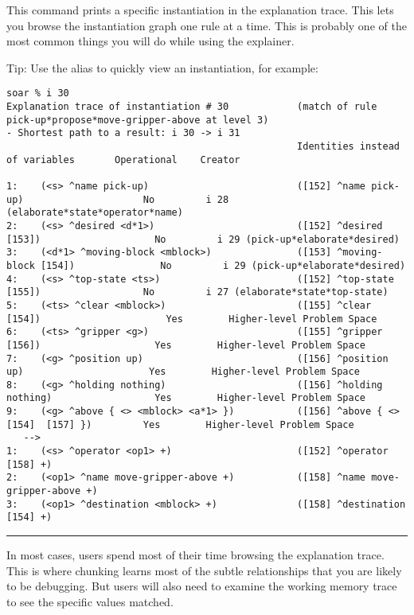 This command prints a specific instantiation in the explanation trace.  This lets you browse the instantiation graph one rule at a time. This is probably one of the most common things you will do while using the explainer.

Tip: Use the alias  to quickly view an instantiation, for example:

{\tiny
\begin{verbatim}
soar % i 30
Explanation trace of instantiation # 30            (match of rule pick-up*propose*move-gripper-above at level 3)
- Shortest path to a result: i 30 -> i 31
                                                   Identities instead of variables       Operational    Creator

1:    (<s> ^name pick-up)                          ([152] ^name pick-up)                     No         i 28 (elaborate*state*operator*name)
2:    (<s> ^desired <d*1>)                         ([152] ^desired [153])                    No         i 29 (pick-up*elaborate*desired)
3:    (<d*1> ^moving-block <mblock>)               ([153] ^moving-block [154])               No         i 29 (pick-up*elaborate*desired)
4:    (<s> ^top-state <ts>)                        ([152] ^top-state [155])                  No         i 27 (elaborate*state*top-state)
5:    (<ts> ^clear <mblock>)                       ([155] ^clear [154])                      Yes        Higher-level Problem Space
6:    (<ts> ^gripper <g>)                          ([155] ^gripper [156])                    Yes        Higher-level Problem Space
7:    (<g> ^position up)                           ([156] ^position up)                      Yes        Higher-level Problem Space
8:    (<g> ^holding nothing)                       ([156] ^holding nothing)                  Yes        Higher-level Problem Space
9:    (<g> ^above { <> <mblock> <a*1> })           ([156] ^above { <>[154]  [157] })         Yes        Higher-level Problem Space
   -->
1:    (<s> ^operator <op1> +)                      ([152] ^operator [158] +)
2:    (<op1> ^name move-gripper-above +)           ([158] ^name move-gripper-above +)
3:    (<op1> ^destination <mblock> +)              ([158] ^destination [154] +)
\end{verbatim}
}

\rule{\textwidth}{1pt}

\textbf{}

In most cases, users spend most of their time browsing the explanation
trace. This is where chunking learns most of the subtle relationships
that you are likely to be debugging. But users will also need to examine
the working memory trace to see the specific values matched.

